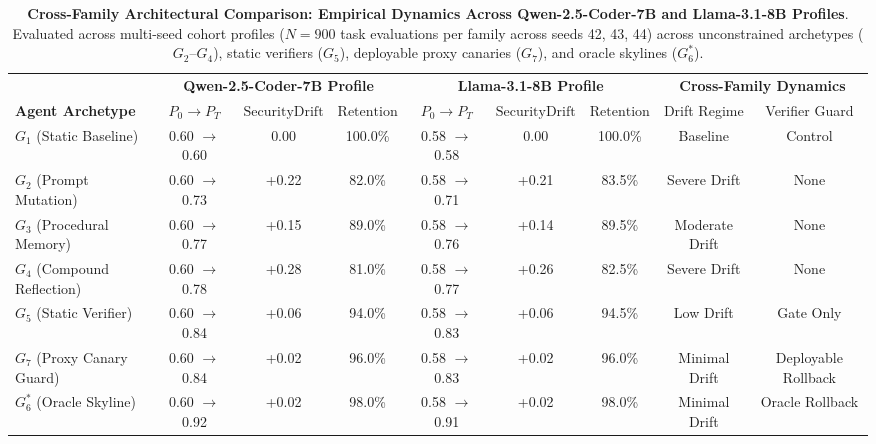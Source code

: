 \begin{table}[t]
\centering
\small
\caption{\textbf{Cross-Family Architectural Comparison: Empirical Dynamics Across Qwen-2.5-Coder-7B and Llama-3.1-8B Profiles}. Evaluated across multi-seed cohort profiles ($N=900$ task evaluations per family across seeds 42, 43, 44) across unconstrained archetypes ($G_2\text{--}G_4$), static verifiers ($G_5$), deployable proxy canaries ($G_7$), and oracle skylines ($G_6^*$).}
\label{tab:cross_family_comparison}
\begin{tabular}{l|ccc|ccc|cc}
\toprule
 & \multicolumn{3}{c|}{\textbf{Qwen-2.5-Coder-7B Profile}} & \multicolumn{3}{c|}{\textbf{Llama-3.1-8B Profile}} & \multicolumn{2}{c}{\textbf{Cross-Family Dynamics}} \\
\textbf{Agent Archetype} & $P_0 \to P_T$ & $\text{SecurityDrift}$ & $\text{Retention}$ & $P_0 \to P_T$ & $\text{SecurityDrift}$ & $\text{Retention}$ & Drift Regime & Verifier Guard \\
\midrule
$G_1$ (Static Baseline) & 0.60 $\to$ 0.60 & 0.00 & 100.0\% & 0.58 $\to$ 0.58 & 0.00 & 100.0\% & Baseline & Control \\
$G_2$ (Prompt Mutation) & 0.60 $\to$ 0.73 & +0.22 & 82.0\% & 0.58 $\to$ 0.71 & +0.21 & 83.5\% & Severe Drift & None \\
$G_3$ (Procedural Memory) & 0.60 $\to$ 0.77 & +0.15 & 89.0\% & 0.58 $\to$ 0.76 & +0.14 & 89.5\% & Moderate Drift & None \\
$G_4$ (Compound Reflection) & 0.60 $\to$ 0.78 & +0.28 & 81.0\% & 0.58 $\to$ 0.77 & +0.26 & 82.5\% & Severe Drift & None \\
$G_5$ (Static Verifier) & 0.60 $\to$ 0.84 & +0.06 & 94.0\% & 0.58 $\to$ 0.83 & +0.06 & 94.5\% & Low Drift & Gate Only \\
$G_7$ (Proxy Canary Guard) & 0.60 $\to$ 0.84 & +0.02 & 96.0\% & 0.58 $\to$ 0.83 & +0.02 & 96.0\% & Minimal Drift & Deployable Rollback \\
$G_6^*$ (Oracle Skyline) & 0.60 $\to$ 0.92 & +0.02 & 98.0\% & 0.58 $\to$ 0.91 & +0.02 & 98.0\% & Minimal Drift & Oracle Rollback \\
\bottomrule
\end{tabular}
\end{table}

